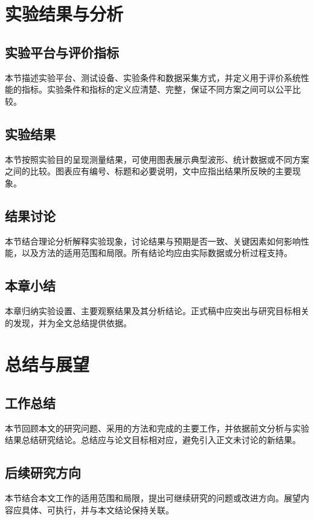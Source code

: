 {\chapter{实验结果与分析}
\section{实验平台与评价指标}
本节描述实验平台、测试设备、实验条件和数据采集方式，并定义用于评价系统性能的指标。实验条件和指标的定义应清楚、完整，保证不同方案之间可以公平比较。
\section{实验结果}
本节按照实验目的呈现测量结果，可使用图表展示典型波形、统计数据或不同方案之间的比较。图表应有编号、标题和必要说明，文中应指出结果所反映的主要现象。
\section{结果讨论}
本节结合理论分析解释实验现象，讨论结果与预期是否一致、关键因素如何影响性能，以及方法的适用范围和局限。所有结论均应由实际数据或分析过程支持。
\section{本章小结}
本章归纳实验设置、主要观察结果及其分析结论。正式稿中应突出与研究目标相关的发现，并为全文总结提供依据。

\chapter{总结与展望}
\section{工作总结}
本节回顾本文的研究问题、采用的方法和完成的主要工作，并依据前文分析与实验结果总结研究结论。总结应与论文目标相对应，避免引入正文未讨论的新结果。
\section{后续研究方向}
本节结合本文工作的适用范围和局限，提出可继续研究的问题或改进方向。展望内容应具体、可执行，并与本文结论保持关联。
}

